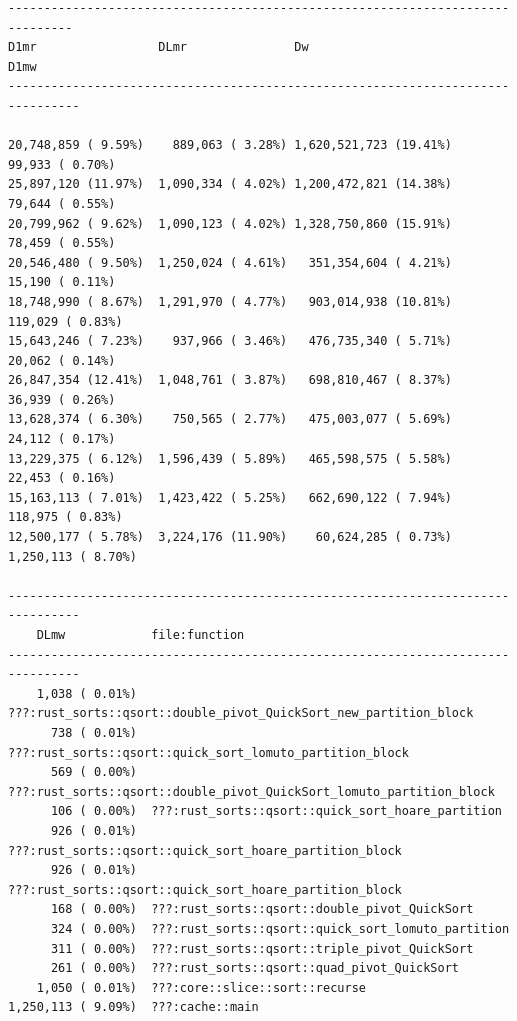 \documentclass[a4paper,oneside,12pt]{book}
\begin{document}
\begin{verbatim}
------------------------------------------------------------------------------- 
D1mr                 DLmr               Dw                         D1mw           
--------------------------------------------------------------------------------

20,748,859 ( 9.59%)    889,063 ( 3.28%) 1,620,521,723 (19.41%)     99,933 ( 0.70%)      
25,897,120 (11.97%)  1,090,334 ( 4.02%) 1,200,472,821 (14.38%)     79,644 ( 0.55%)        
20,799,962 ( 9.62%)  1,090,123 ( 4.02%) 1,328,750,860 (15.91%)     78,459 ( 0.55%)        
20,546,480 ( 9.50%)  1,250,024 ( 4.61%)   351,354,604 ( 4.21%)     15,190 ( 0.11%)        
18,748,990 ( 8.67%)  1,291,970 ( 4.77%)   903,014,938 (10.81%)    119,029 ( 0.83%)        
15,643,246 ( 7.23%)    937,966 ( 3.46%)   476,735,340 ( 5.71%)     20,062 ( 0.14%)        
26,847,354 (12.41%)  1,048,761 ( 3.87%)   698,810,467 ( 8.37%)     36,939 ( 0.26%)        
13,628,374 ( 6.30%)    750,565 ( 2.77%)   475,003,077 ( 5.69%)     24,112 ( 0.17%)        
13,229,375 ( 6.12%)  1,596,439 ( 5.89%)   465,598,575 ( 5.58%)     22,453 ( 0.16%)        
15,163,113 ( 7.01%)  1,423,422 ( 5.25%)   662,690,122 ( 7.94%)    118,975 ( 0.83%)      
12,500,177 ( 5.78%)  3,224,176 (11.90%)    60,624,285 ( 0.73%)  1,250,113 ( 8.70%)  

--------------------------------------------------------------------------------
    DLmw            file:function
--------------------------------------------------------------------------------
    1,038 ( 0.01%)  ???:rust_sorts::qsort::double_pivot_QuickSort_new_partition_block
      738 ( 0.01%)  ???:rust_sorts::qsort::quick_sort_lomuto_partition_block
      569 ( 0.00%)  ???:rust_sorts::qsort::double_pivot_QuickSort_lomuto_partition_block
      106 ( 0.00%)  ???:rust_sorts::qsort::quick_sort_hoare_partition
      926 ( 0.01%)  ???:rust_sorts::qsort::quick_sort_hoare_partition_block
      926 ( 0.01%)  ???:rust_sorts::qsort::quick_sort_hoare_partition_block
      168 ( 0.00%)  ???:rust_sorts::qsort::double_pivot_QuickSort
      324 ( 0.00%)  ???:rust_sorts::qsort::quick_sort_lomuto_partition
      311 ( 0.00%)  ???:rust_sorts::qsort::triple_pivot_QuickSort
      261 ( 0.00%)  ???:rust_sorts::qsort::quad_pivot_QuickSort
    1,050 ( 0.01%)  ???:core::slice::sort::recurse
1,250,113 ( 9.09%)  ???:cache::main
\end{verbatim}
\end{document}
